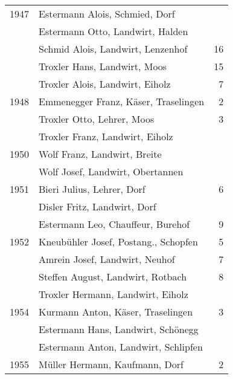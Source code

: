 {\begin{longtable}{ l l r }
        \\
        1947          & Estermann Alois, Schmied, Dorf            &             \\
                      & Estermann Otto, Landwirt, Halden          &             \\
                      & Schmid Alois, Landwirt, Lenzenhof         & 16          \\
                      & Troxler Hans, Landwirt, Moos              & 15          \\
                      & Troxler Alois, Landwirt, Eiholz           & 7           \\
        1948          & Emmenegger Franz, Käser, Traselingen      & 2           \\
                      & Troxler Otto, Lehrer, Moos                & 3           \\
                      & Troxler Franz, Landwirt, Eiholz           &             \\
        1950          & Wolf Franz, Landwirt, Breite              &             \\
                      & Wolf Josef, Landwirt, Obertannen          &             \\
        1951          & Bieri Julius, Lehrer, Dorf                & 6           \\
                      & Disler Fritz, Landwirt, Dorf              &             \\
                      & Estermann Leo, Chauffeur, Burehof         & 9           \\
        1952          & Kneubühler Josef, Postang., Schopfen      & 5           \\
                      & Amrein Josef, Landwirt, Neuhof            & 7           \\
                      & Steffen August, Landwirt, Rotbach         & 8           \\
                      & Troxler Hermann, Landwirt, Eiholz         &             \\
        1954          & Kurmann Anton, Käser, Traselingen         & 3           \\
                      & Estermann Hans, Landwirt, Schönegg        &             \\
                      & Estermann Anton, Landwirt, Schlipfen      &             \\
        1955          & Müller Hermann, Kaufmann, Dorf            & 2           \\

\end{longtable}}
